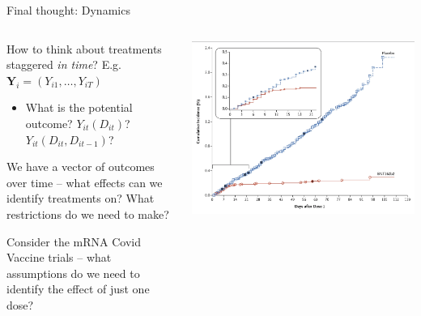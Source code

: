 \documentclass[notes,11pt, aspectratio=169]{beamer}
\newenvironment{wideitemize}{\itemize\addtolength{\itemsep}{10pt}}{\enditemize}
\begin{document}
\begin{frame}{Final thought: Dynamics}
\begin{columns}[T] %
  \begin{column}{.5\textwidth}
    \begin{wideitemize}
    \item How to think about treatments staggered \emph{in time}? E.g. $\mathbf{Y}_{i} = (Y_{i1}, \ldots, Y_{iT})$
      \begin{itemize}
      \item What is the potential outcome? $Y_{it}(D_{it})$?  $Y_{it}(D_{it}, D_{it-1})$? 
      \end{itemize}
    \item We have a vector of outcomes over time -- what effects can we identify treatments on? What restrictions do we need to make?
    \item Consider the mRNA Covid Vaccine trials -- what assumptions do we need to identify the effect of just one dose?
    \end{wideitemize}
  \end{column}%
  \hfill%
  \begin{column}{.5\textwidth}
    \begin{center}
        \includegraphics[width=\linewidth]{images/vaccine_dynamics.png}
    \end{center}
  \end{column}
\end{columns}

\end{frame}
\end{document}
